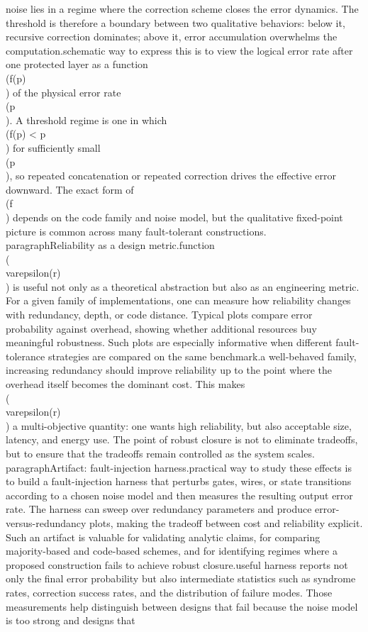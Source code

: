 noise lies in a regime where the correction scheme closes the error dynamics. The threshold is therefore a boundary between two qualitative behaviors: below it, recursive correction dominates; above it, error accumulation overwhelms the computation.\n\nA schematic way to express this is to view the logical error rate after one protected layer as a function \\(f(p)\\) of the physical error rate \\(p\\). A threshold regime is one in which \\(f(p) < p\\) for sufficiently small \\(p\\), so repeated concatenation or repeated correction drives the effective error downward. The exact form of \\(f\\) depends on the code family and noise model, but the qualitative fixed-point picture is common across many fault-tolerant constructions.\n\n\\paragraph{Reliability as a design metric.}\nThe function \\(\\varepsilon(r)\\) is useful not only as a theoretical abstraction but also as an engineering metric. For a given family of implementations, one can measure how reliability changes with redundancy, depth, or code distance. Typical plots compare error probability against overhead, showing whether additional resources buy meaningful robustness. Such plots are especially informative when different fault-tolerance strategies are compared on the same benchmark.\n\nIn a well-behaved family, increasing redundancy should improve reliability up to the point where the overhead itself becomes the dominant cost. This makes \\(\\varepsilon(r)\\) a multi-objective quantity: one wants high reliability, but also acceptable size, latency, and energy use. The point of robust closure is not to eliminate tradeoffs, but to ensure that the tradeoffs remain controlled as the system scales.\n\n\\paragraph{Artifact: fault-injection harness.}\nA practical way to study these effects is to build a fault-injection harness that perturbs gates, wires, or state transitions according to a chosen noise model and then measures the resulting output error rate. The harness can sweep over redundancy parameters and produce error-versus-redundancy plots, making the tradeoff between cost and reliability explicit. Such an artifact is valuable for validating analytic claims, for comparing majority-based and code-based schemes, and for identifying regimes where a proposed construction fails to achieve robust closure.\n\nA useful harness reports not only the final error probability but also intermediate statistics such as syndrome rates, correction success rates, and the distribution of failure modes. Those measurements help distinguish between designs that fail because the noise model is too strong and designs that 